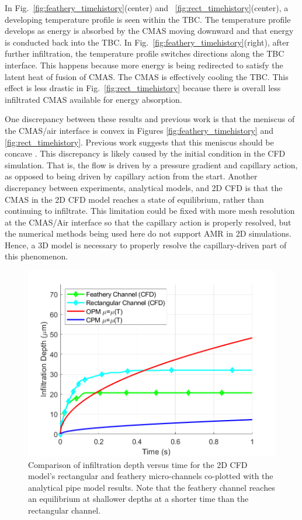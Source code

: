 \documentclass[%
 aip,
 amsmath,amssymb,
 reprint,%
floatfix]{revtex4-1}
\begin{document}
In Fig.~\ref{fig:feathery_timehistory}(center) and ~\ref{fig:rect_timehistory}(center), a developing temperature profile is seen within the TBC. The temperature profile develops as energy is absorbed by the CMAS moving downward and that energy is conducted back into the TBC. 
In Fig.~\ref{fig:feathery_timehistory}(right), after further infiltration, the temperature profile switches directions along the TBC interface.
This happens because more energy is being redirected to satisfy the latent heat of fusion of CMAS. The CMAS is effectively cooling the TBC.
This effect is less drastic in Fig.~\ref{fig:rect_timehistory} because there is overall less infiltrated CMAS available for energy absorption.

One discrepancy between these results and previous work is that the meniscus of the CMAS/air interface is convex in Figures \ref{fig:feathery_timehistory} and \ref{fig:rect_timehistory}. Previous work suggests that this meniscus should be concave \cite{Naraparaju2019}. This discrepancy is likely caused by the initial condition in the CFD simulation. That is, the flow is driven by a pressure gradient and capillary action, as opposed to being driven by capillary action from the start. Another discrepancy between experiments, analytical models, and 2D CFD is that the CMAS in the 2D CFD model reaches a state of equilibrium, rather than continuing to infiltrate. This limitation could be fixed with more mesh resolution at the CMAS/Air interface so that the capillary action is properly resolved, but the numerical methods being used here do not support AMR in 2D simulations. Hence, a 3D model is necessary to properly resolve the capillary-driven part of this phenomenon. 


\begin{figure}
    \centering
    \includegraphics[width=\linewidth]{Figures/2d_results.png}
    \caption{Comparison of infiltration depth versus time for the 2D CFD model's rectangular and feathery micro-channels co-plotted with the analytical pipe model results. Note that the feathery channel reaches an equilibrium at shallower depths at a shorter time than the rectangular channel.}
    \label{fig:rect_v_feather}
\end{figure}
\end{document}
